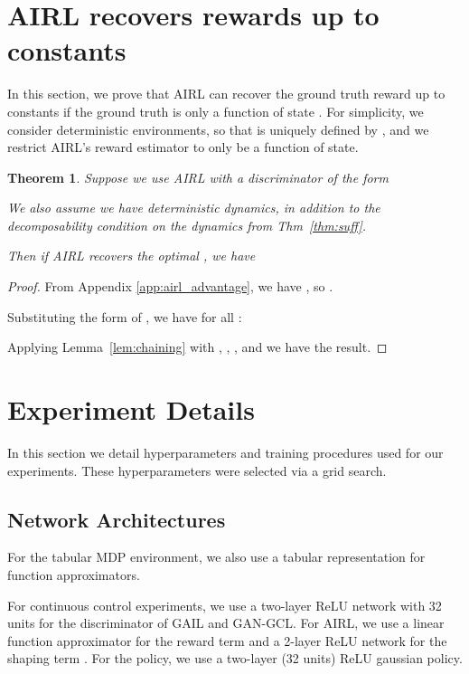 \documentclass{article} \usepackage{iclr2018_conference,times}
\newtheorem{theorem}{Theorem}[section]
\begin{document}
\section{AIRL recovers rewards up to constants}
\label{app:airl_proof}

In this section, we prove that AIRL can recover the ground truth reward up to constants if the ground truth is only a function of state . For simplicity, we consider deterministic environments, so that  is uniquely defined by , and we restrict AIRL's reward estimator  to only be a function of state.

\begin{theorem}
Suppose we use AIRL with a discriminator of the form

We also assume we have deterministic dynamics, in addition to the decomposability condition on the dynamics from Thm~\ref{thm:suff}.

Then if AIRL recovers the optimal , we have


\end{theorem}
\begin{proof}

From Appendix \ref{app:airl_advantage}, we have , so .

Substituting the form of , we have for all :


Applying Lemma~\ref{lem:chaining} with , , , and  we have the result.
\end{proof}

\section{Experiment Details}
\label{app:hyperparams}
In this section we detail hyperparameters and training procedures used for our experiments. These hyperparameters were selected via a grid search.

\subsection{Network Architectures}
For the tabular MDP environment, we also use a tabular representation for function approximators.

For continuous control experiments, we use a two-layer ReLU network with 32 units for the discriminator of GAIL and GAN-GCL. For AIRL, we use a linear function approximator for the reward term  and a 2-layer ReLU network for the shaping term . For the policy, we use a two-layer (32 units) ReLU gaussian policy.
\end{document}

